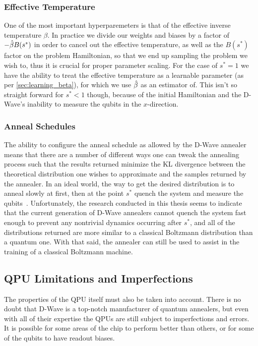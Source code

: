 \subsubsection{Effective Temperature}
One of the most important hyperparemeters is that of the effective inverse temperature \( \beta \).
In practice we divide our weights and biases by a factor of \( -\hat{\beta} B(s^*) \) in order to cancel out the effective temperature, as well as the \( B(s^*) \) factor on the problem Hamiltonian, so that we end up sampling the problem we wish to, thus it is crucial for proper parameter scaling.
For the case of \( s^* = 1 \) we have the ability to treat the effective temperature as a learnable parameter (as per \cref{sec:learning_beta}), for which we use \( \hat{\beta} \) as an estimator of.
This isn't so straight forward for \( s^* < 1 \) though, because of the initial Hamiltonian and the D-Wave's inability to measure the qubits in the \( x \)-direction.

\subsubsection{Anneal Schedules}
The ability to configure the anneal schedule as allowed by the D-Wave annealer means that there are a number of different ways one can tweak the annealing process such that the results returned minimize the KL divergence between the theoretical distribution one wishes to approximate and the samples returned by the annealer.
In an ideal world, the way to get the desired distribution is to anneal slowly at first, then at the point \( s^* \) quench the system and measure the qubits~\cite{amin_2018}.
Unfortunately, the research conducted in this thesis seems to indicate that the current generation of D-Wave annealers cannot quench the system fast enough to prevent any nontrivial dynamics occurring after \( s^* \), and all of the distributions returned are more similar to a classical Boltzmann distribution than a quantum one.
With that said, the annealer can still be used to assist in the training of a classical Boltzmann machine.

\subsection{QPU Limitations and Imperfections}
The properties of the QPU itself must also be taken into account.
There is no doubt that D-Wave is a top-notch manufacturer of quantum annealers, but even with all of their expertise the QPUs are still subject to imperfections and errors.
It is possible for some areas of the chip to perform better than others, or for some of the qubits to have readout biases.

